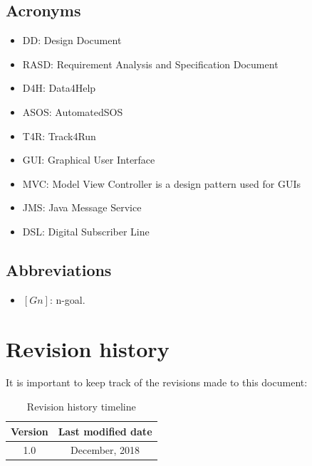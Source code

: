 \documentclass[a4paper, hidelinks, 12pt]{report}
\begin{document}
	\subsection{Acronyms}
	\begin{itemize}
		\item{DD}: Design Document
		\item{RASD}: Requirement Analysis and Specification Document
		\item{D4H}: Data4Help
		\item{ASOS}: AutomatedSOS
		\item{T4R}: Track4Run
		\item{GUI}: Graphical User Interface
		\item{MVC}: Model View Controller is a design pattern used for GUIs
		\item{JMS}: Java Message Service 
		\item{DSL}: Digital Subscriber Line
	\end{itemize}
	
	\subsection{Abbreviations}
	\begin{itemize}
		\item $[Gn]$: n-goal.
	\end{itemize}
	
	\section{Revision history}
	It is important to keep track of the revisions made to this document: \\
	
	\begin{table}[h]
		\centering
		\begin{tabular}{c c}
			\hline\hline
			\textbf{Version} & \textbf{Last modified date} \\ [0.5ex]
			\hline
			1.0 &  \nth{10} December, 2018  \\
			\hline
		\end{tabular}
		\caption{Revision history timeline}
		\label{fig:Revision history}
	\end{table}
	
\end{document}
